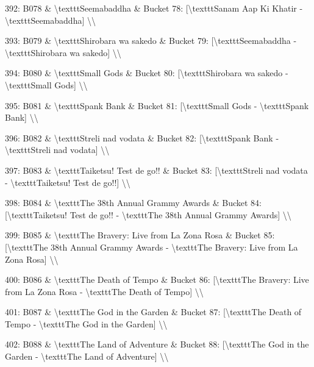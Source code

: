 \documentclass[11pt,a4paper]{article}
\begin{document}
392: B078 \& \textbackslash{}texttt{Seemabaddha} \& Bucket 78: [\textbackslash{}texttt{Sanam Aap Ki Khatir} - \textbackslash{}texttt{Seemabaddha}] \textbackslash{}\textbackslash{}

393: B079 \& \textbackslash{}texttt{Shirobara wa sakedo} \& Bucket 79: [\textbackslash{}texttt{Seemabaddha} - \textbackslash{}texttt{Shirobara wa sakedo}] \textbackslash{}\textbackslash{}

394: B080 \& \textbackslash{}texttt{Small Gods} \& Bucket 80: [\textbackslash{}texttt{Shirobara wa sakedo} - \textbackslash{}texttt{Small Gods}] \textbackslash{}\textbackslash{}

395: B081 \& \textbackslash{}texttt{Spank Bank} \& Bucket 81: [\textbackslash{}texttt{Small Gods} - \textbackslash{}texttt{Spank Bank}] \textbackslash{}\textbackslash{}

396: B082 \& \textbackslash{}texttt{Streli nad vodata} \& Bucket 82: [\textbackslash{}texttt{Spank Bank} - \textbackslash{}texttt{Streli nad vodata}] \textbackslash{}\textbackslash{}

397: B083 \& \textbackslash{}texttt{Taiketsu! Test de go!!} \& Bucket 83: [\textbackslash{}texttt{Streli nad vodata} - \textbackslash{}texttt{Taiketsu! Test de go!!}] \textbackslash{}\textbackslash{}

398: B084 \& \textbackslash{}texttt{The 38th Annual Grammy Awards} \& Bucket 84: [\textbackslash{}texttt{Taiketsu! Test de go!!} - \textbackslash{}texttt{The 38th Annual Grammy Awards}] \textbackslash{}\textbackslash{}

399: B085 \& \textbackslash{}texttt{The Bravery: Live from La Zona Rosa} \& Bucket 85: [\textbackslash{}texttt{The 38th Annual Grammy Awards} - \textbackslash{}texttt{The Bravery: Live from La Zona Rosa}] \textbackslash{}\textbackslash{}

400: B086 \& \textbackslash{}texttt{The Death of Tempo} \& Bucket 86: [\textbackslash{}texttt{The Bravery: Live from La Zona Rosa} - \textbackslash{}texttt{The Death of Tempo}] \textbackslash{}\textbackslash{}

401: B087 \& \textbackslash{}texttt{The God in the Garden} \& Bucket 87: [\textbackslash{}texttt{The Death of Tempo} - \textbackslash{}texttt{The God in the Garden}] \textbackslash{}\textbackslash{}

402: B088 \& \textbackslash{}texttt{The Land of Adventure} \& Bucket 88: [\textbackslash{}texttt{The God in the Garden} - \textbackslash{}texttt{The Land of Adventure}] \textbackslash{}\textbackslash{}
\end{document}
